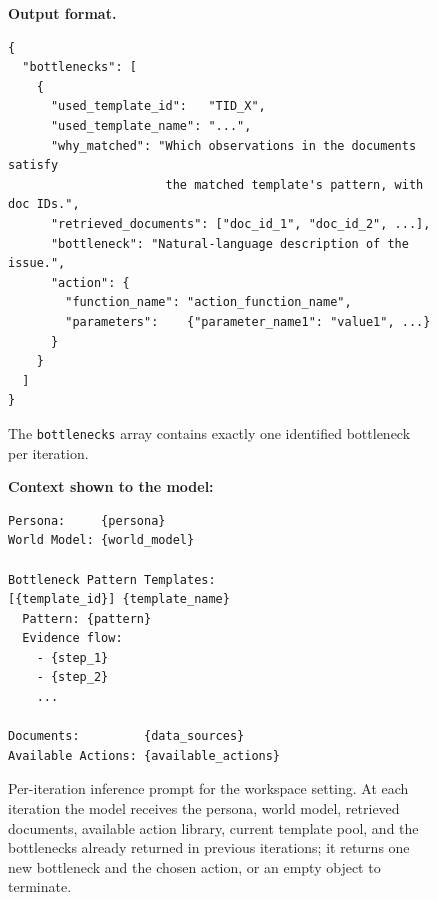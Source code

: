 \documentclass{llmxive}
\begin{document}
\begin{figure}[!t]
\begin{tcolorbox}[colback=gray!5, colframe=gray!50,
                  boxrule=0.5pt, arc=2mm,
                  left=4pt, right=4pt, top=3pt, bottom=3pt]
\medskip
\textbf{Output format.}
\begin{verbatim}
{
  "bottlenecks": [
    {
      "used_template_id":   "TID_X",
      "used_template_name": "...",
      "why_matched": "Which observations in the documents satisfy
                      the matched template's pattern, with doc IDs.",
      "retrieved_documents": ["doc_id_1", "doc_id_2", ...],
      "bottleneck": "Natural-language description of the issue.",
      "action": {
        "function_name": "action_function_name",
        "parameters":    {"parameter_name1": "value1", ...}
      }
    }
  ]
}
\end{verbatim}
The \texttt{bottlenecks} array contains exactly one identified bottleneck per iteration.

\medskip
\textbf{Context shown to the model:}
\begin{verbatim}
Persona:     {persona}
World Model: {world_model}

Bottleneck Pattern Templates:
[{template_id}] {template_name}
  Pattern: {pattern}
  Evidence flow:
    - {step_1}
    - {step_2}
    ...

Documents:         {data_sources}
Available Actions: {available_actions}
\end{verbatim}
\end{tcolorbox}
\caption{Per-iteration inference prompt for the workspace setting. At each iteration the model receives the persona, world model, retrieved documents, available action library, current template pool, and the bottlenecks already returned in previous iterations; it returns one new bottleneck and the chosen action, or an empty object to terminate.}
\label{fig:prompt_inference_workspace}
\end{figure}
\end{document}
